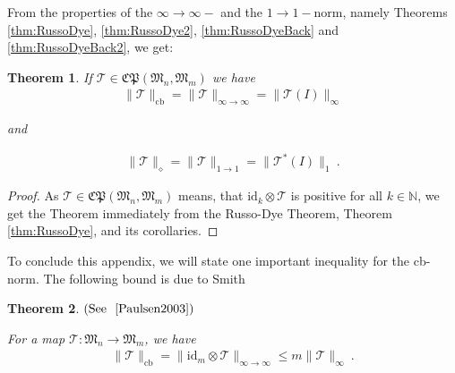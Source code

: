 \documentclass[a4paper
               ,12pt
               ,DIV=12
               ,oneside
               ]
               {amsart}
\theoremstyle{plain}
\newtheorem{thm}{Theorem}
\theoremstyle{remark}
\def\ra{\rightarrow}
\def\lb{\left(}
\def\rb{\right)}
\def\i{\text{id}}
\newcommand\N{\mathbb{N}}
\newcommand\M{\mathfrak{M}}
\newcommand{\Tm}{\mathcal{T}}
\begin{document}
From the properties of the $\infty\ra\infty-$ and the $1\ra 1-$norm, namely Theorems \ref{thm:RussoDye}, \ref{thm:RussoDye2}, \ref{thm:RussoDyeBack} and \ref{thm:RussoDyeBack2}, we get:

\begin{thm}

If $\Tm\in\mathfrak{CP}\lb \M_n,\M_m\rb$ we have
\begin{align*}
\| \Tm\|_{\text{cb}} = \| \Tm\|_{\infty\ra\infty} = \| \Tm\lb I\rb\|_\infty
\end{align*}

and

\begin{align*}
\| \Tm\|_{\diamond} = \| \Tm\|_{1\ra 1} = \| \Tm^{*}\lb I\rb\|_1\medspace.
\end{align*}

\label{thm:cbNormCP}

\end{thm}

\begin{proof}

As $\Tm\in\mathfrak{CP}\lb \M_n,\M_m\rb$ means, that $\i_k\otimes \Tm$ is positive for all $k\in\N$, we get the Theorem immediately from the Russo-Dye Theorem, Theorem \ref{thm:RussoDye}, and its corollaries.

\end{proof}

To conclude this appendix, we will state one important inequality for the cb-norm. The following bound is due to Smith

\begin{thm}$\lb \text{See ~\cite{Paulsen2003}}\rb$

For a map $\Tm:\M_n\ra\M_m$, we have
\begin{align*}
\|\Tm\|_{\text{cb}} = \|\i_m\otimes \Tm\|_{\infty\ra\infty}\leq m\|\Tm\|_\infty\medspace .
\end{align*}

\label{thm:Smith}

\end{thm}



\end{document}

